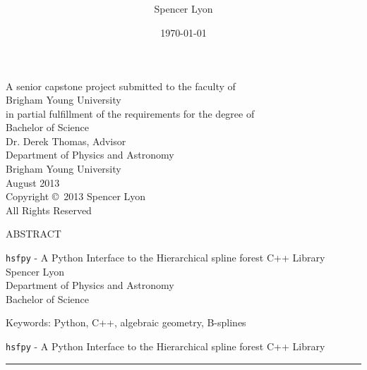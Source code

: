 \documentclass[12pt, twoside]{article}
\title{
    \vspace{-.6in}
    \usefont{OT1}{bch}{b}{n}
    \normalfont \normalsize \textsc{ } \\ [25pt]
    \horrule{0.5pt}
    \huge \thetitle \\
    \horrule{2pt}
  }
\author{
    Spencer Lyon
  }
\date{
  \normalfont \normalsize
  \today \\[-4pt] \normalsize
  }
\theoremstyle{definition} %
\numberwithin{equation}{section}
\newcommand{\mainstretch}{\setstretch{1.6}}
\newcommand \thetitle{{\texttt{hsfpy}} -  A Python Interface to the Hierarchical spline forest C++ Library}
\begin{document}
\begin{titlepage}
  \maketitle
  \thispagestyle{empty}
  \begin{center}

  A senior capstone project submitted to the faculty of \\
  Brigham Young University\\
  in partial fulfillment of the requirements for the degree of \\[\baselineskip]
  Bachelor of Science \\ [1.5cm]

  Dr. Derek Thomas, Advisor \\ [1.5cm]

  Department of Physics and Astronomy \\[\baselineskip]
  Brigham Young University \\[\baselineskip]
  August 2013\\[2.0cm]

  Copyright \copyright\ 2013 Spencer Lyon \\[\baselineskip]

  All Rights Reserved

  \end{center}
\end{titlepage}

  \newpage
  \thispagestyle{empty}
  {\centering
  \large ABSTRACT \\ [\baselineskip]

  \normalfont \normalsize

  \thetitle \\ [\baselineskip]

  Spencer Lyon\\
  Department of Physics and Astronomy\\
  Bachelor of Science \\ [\baselineskip]
  }

  

  \vfill
  \noindent Keywords: Python, C++, algebraic geometry, B-splines

  \newpage
  \tableofcontents

\newpage
{}  %
\setcounter{page}{1}  %
\thispagestyle{empty}
\pagestyle{mainDoc}

\begin{center}
\huge{\thetitle}  %
\rule{\linewidth}{.1pt}
\end{center}

\mainstretch{}






\newpage
\printbibliography

\newpage
\appendix


\end{document}
